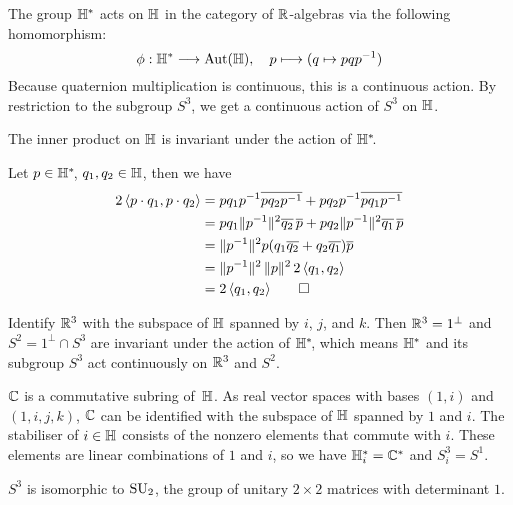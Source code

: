 The group $\mathbb{H}^*$ acts
on $\mathbb{H}$ in the category of $\mathbb{R}$-algebras via the following homomorphism:
\[ \phi : \mathbb{H}^* \longrightarrow \operatorname{Aut}(\mathbb{H}),
   \quad
   p \longmapsto (q \mapsto p q p^{-1}) \]
Because quaternion multiplication is continuous,
this is a continuous action.
By restriction to the subgroup $S^3\!$,
we get a continuous action of $S^3$ on $\mathbb{H}$.

The inner product on $\mathbb{H}$ is invariant under the action of $\mathbb{H}^*\!$.

\proof
Let $p \in \mathbb{H}^*\!$, $q_1, q_2 \in \mathbb{H}$,
then we have
\begin{align*}
   2 \, \inp{p \cdot q_1}{p \cdot q_2}
&= p q_1 p^{-1} \overline{p q_2 p^{-1}} + p q_2 p^{-1} \overline{p q_1 p^{-1}} \\
&= p q_1 \nsq{p^{-1}} \overline{q_2} \, \overline{p} + p q_2 \nsq{p^{-1}} \overline{q_1} \, \overline{p} \\
&= \nsq{p^{-1}} p (q_1  \overline{q_2} + q_2 \overline{q_1}) \overline{p} \\
&= \nsq{p^{-1}} \, \nsq{p} \, 2 \, \inp{q_1}{q_2} \\
&= 2 \, \inp{q_1}{q_2}
   \tag*{\qed}
\end{align*}

Identify $\mathbb{R}^3$ with the subspace of $\mathbb{H}$ spanned by $i$, $j$, and $k$.
Then $\mathbb{R}^3 = 1^\perp$ and $S^2 = 1^\perp \cap S^3$ are invariant under the action of $\mathbb{H}^*\!$,
which means $\mathbb{H}^*$ and its subgroup $S^3$ act continuously on $\mathbb{R}^3$ and $S^2\!$.

$\mathbb{C}$ is a commutative subring of~$\mathbb{H}$.
As real vector spaces with bases $(1, i)$ and $(1, i, j, k)$,
$\mathbb{C}$ can be identified with the subspace of $\mathbb{H}$ spanned by $1$ and $i$.
The stabiliser of $i \in \mathbb{H}$ consists of the nonzero elements that commute with $i$.
These elements are linear combinations of $1$ and $i$,
so we have $\mathbb{H}^*_i = \mathbb{C}^*$ and $S^3_i = S^1\!$.

$S^3$ is isomorphic to $\operatorname{SU}_2$, the group of unitary $2 \times 2$ matrices with determinant $1$.

